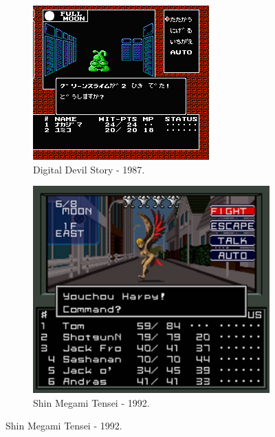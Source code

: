 \documentclass[
	12pt,				%
	openright,			%
	twoside,			%
	a4paper,			%
	english,			%
	french,				%
	spanish,			%
	brazil				%
	]{abntex2}
\begin{document}
\begin{figure}[h!]
  \centering
  \begin{subfigure}[b]{0.4\linewidth}
    \includegraphics[width=\linewidth]{mtb.jpg}
     \caption{Digital Devil Story - 1987.}
  \end{subfigure}
  \begin{subfigure}[b]{0.4\linewidth}
    \includegraphics[width=\linewidth]{smt1b.jpg}
    \caption{Shin Megami Tensei - 1992.}

\end{subfigure}
\end{figure}
\end{document}
